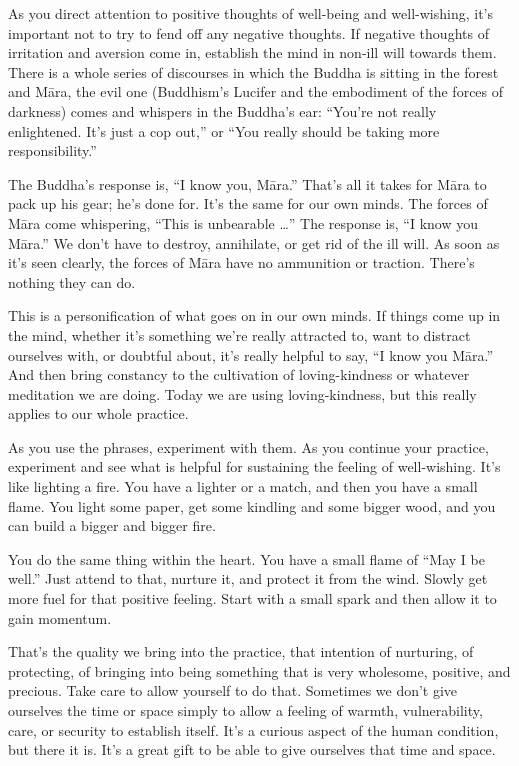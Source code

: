 As you direct attention to positive thoughts of well-being and
well-wishing, it’s important not to try to fend off any negative
thoughts. If negative thoughts of irritation and aversion come in,
establish the mind in non-ill will towards them. There is a whole series
of discourses in which the Buddha is sitting in the forest and Māra, the
evil one (Buddhism’s Lucifer and the embodiment of the forces of
darkness) comes and whispers in the Buddha’s ear: “You’re not really
enlightened. It’s just a cop out,” or “You really should be taking more
responsibility.”

The Buddha’s response is, “I know you, Māra.” That’s all it takes for
Māra to pack up his gear; he’s done for. It’s the same for our own
minds. The forces of Māra come whispering, “This is unbearable \ldots{}” The
response is, “I know you Māra.” We don’t have to destroy, annihilate, or
get rid of the ill will. As soon as it’s seen clearly, the forces of
Māra have no ammunition or traction. There’s nothing they can do.

This is a personification of what goes on in our own minds. If things
come up in the mind, whether it’s something we’re really attracted to,
want to distract ourselves with, or doubtful about, it’s really helpful
to say, “I know you Māra.” And then bring constancy to the cultivation
of loving-kindness or whatever meditation we are doing. Today we are
using loving-kindness, but this really applies to our whole practice.

As you use the phrases, experiment with them. As you continue your
practice, experiment and see what is helpful for sustaining the feeling
of well-wishing. It’s like lighting a fire. You have a lighter or a
match, and then you have a small flame. You light some paper, get some
kindling and some bigger wood, and you can build a bigger and bigger
fire.

You do the same thing within the heart. You have a small flame of “May I
be well.” Just attend to that, nurture it, and protect it from the wind.
Slowly get more fuel for that positive feeling. Start with a small spark
and then allow it to gain momentum.

That’s the quality we bring into the practice, that intention of
nurturing, of protecting, of bringing into being something that is very
wholesome, positive, and precious. Take care to allow yourself to do
that. Sometimes we don’t give ourselves the time or space simply to
allow a feeling of warmth, vulnerability, care, or security to establish
itself. It’s a curious aspect of the human condition, but there it is.
It’s a great gift to be able to give ourselves that time and space.


